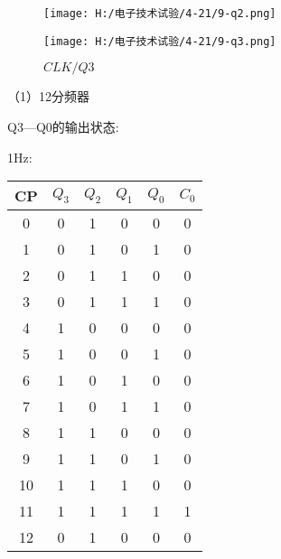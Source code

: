 \documentclass{article}
\begin{document}
\begin{figure}[h]
  \begin{minipage}[t]{0.5\linewidth} %
    \centering   
    \texttt{[image: H:/电子技术试验/4-21/9-q2.png]}   
    \caption{$CLK/Q2$}   
    \label{fig:side:a}   
  \end{minipage}%
  \begin{minipage}[t]{0.5\linewidth}   
    \centering   
    \texttt{[image: H:/电子技术试验/4-21/9-q3.png]}   
    \caption{$CLK/Q3$}   
    \label{fig:side:b}   
  \end{minipage}   
\end{figure}
\par
\newpage
（1）12分频器\par

Q3—Q0的输出状态:  \par
1Hz:\par
\begin{table}[h]
  \centering  
  \begin{tabular}{c|c|c|c|c|c}
      \hline
            CP             & $Q_3$  &$Q_2$  &$Q_1$  &$Q_0$  &$C_0$      \\ \hline
            0              & 0      &1      & 0     & 0     &0 \\ \hline
            1              & 0      &1      & 0     & 1     &0 \\ \hline
            2              & 0      &1      & 1     & 0     &0 \\ \hline
            3              & 0      &1      & 1     & 1     &0 \\ \hline
            4              & 1      &0      & 0     & 0     &0 \\ \hline
            5              & 1      &0      & 0     & 1     &0 \\ \hline
            6              & 1      &0      & 1     & 0     &0 \\ \hline
            7              & 1      &0      & 1     & 1     &0 \\ \hline
            8              & 1      &1      & 0     & 0     &0 \\ \hline
            9              & 1      &1      & 0     & 1     &0 \\ \hline
            10             & 1      &1      & 1     & 0     &0 \\ \hline
            11             & 1      &1      & 1     & 1     &1 \\ \hline
            12             & 0      &1      & 0     & 0     &0 \\ \hline
          \end{tabular}
\end{table}
\end{document}
